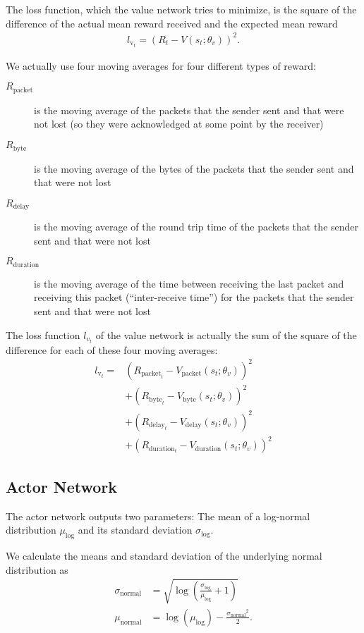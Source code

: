 \documentclass[sigconf]{acmart}
\begin{document}
The loss function, which the value network tries to minimize, is the square of the difference of the actual mean reward received and the expected mean reward
\begin{align*}
l_{\text{v}_t} = \left(R_t - V(s_t; \theta_v)\right)^2.
\end{align*}

We actually use four moving averages for four different types of reward: 
\begin{description}
\item[$\textit{R}_\text{packet}$] is the moving average of the packets that the sender sent and that were not lost (so they were acknowledged at some point by the receiver)
\item[$\textit{R}_\text{byte}$] is the moving average of the bytes of the packets that the sender sent and that were not lost
\item[$\textit{R}_\text{delay}$] is the moving average of the round trip time of the packets that the sender sent and that were not lost
\item[$\textit{R}_\text{duration}$] is the moving average of the time between receiving the last packet and receiving this packet (``inter-receive time'') for the packets that the sender sent and that were not lost
\end{description}

The loss function $l_{v_t}$ of the value network is actually the sum of the square of the difference for each of these four moving averages:
\begin{align*}
l_{\text{v}_t} =& \left(R_{\text{packet}_t} - V_\text{packet}(s_t; \theta_v)\right)^2 \\
&+\left(R_{\text{byte}_t} - V_\text{byte}(s_t; \theta_v)\right)^2 \\
&+\left(R_{\text{delay}_t} - V_\text{delay}(s_t; \theta_v)\right)^2 \\
&+\left(R_{\text{duration}_t} - V_\text{duration}(s_t; \theta_v)\right)^2
\end{align*}

\subsection{Actor Network}
\label{subsec:actor}

The actor network outputs two parameters: The mean of a log-normal distribution $\mu_\text{log}$ and its standard deviation $\sigma_\text{log}$. 

We calculate the means and standard deviation of the underlying normal distribution as
\begin{align*}
\sigma_\text{normal} &= \sqrt{\log \left( \frac{\sigma_\text{log}}{\mu_\text{log}} +1 \right)} \\
\mu_\text{normal} &= \log\left(\mu_\text{log}\right) - \frac{{\sigma_\text{normal}}^2}{2}.
\end{align*}
\end{document}
